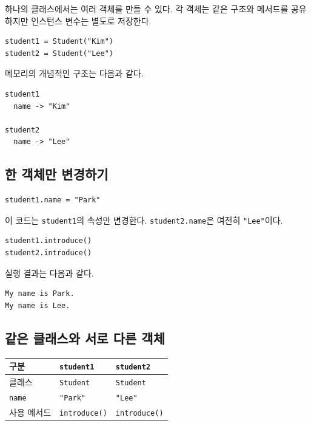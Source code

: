 \documentclass[11pt,a4paper]{article}
\begin{document}
하나의 클래스에서는 여러 객체를 만들 수 있다. 각 객체는 같은 구조와 메서드를 공유하지만 인스턴스 변수는 별도로 저장한다.

\begin{lstlisting}
student1 = Student("Kim")
student2 = Student("Lee")
\end{lstlisting}

메모리의 개념적인 구조는 다음과 같다.

\begin{verbatim}
student1
  name -> "Kim"

student2
  name -> "Lee"
\end{verbatim}

\subsection{한 객체만 변경하기}

\begin{lstlisting}
student1.name = "Park"
\end{lstlisting}

이 코드는 \texttt{student1}의 속성만 변경한다. \texttt{student2.name}은 여전히 \texttt{"Lee"}이다.

\begin{lstlisting}
student1.introduce()
student2.introduce()
\end{lstlisting}

실행 결과는 다음과 같다.

\begin{verbatim}
My name is Park.
My name is Lee.
\end{verbatim}

\subsection{같은 클래스와 서로 다른 객체}

\begin{center}
\begin{tabular}{lll}
\toprule
구분 & \texttt{student1} & \texttt{student2} \\
\midrule
클래스 & \texttt{Student} & \texttt{Student} \\
\texttt{name} & \texttt{"Park"} & \texttt{"Lee"} \\
사용 메서드 & \texttt{introduce()} & \texttt{introduce()} \\
\bottomrule
\end{tabular}
\end{center}
\end{document}
